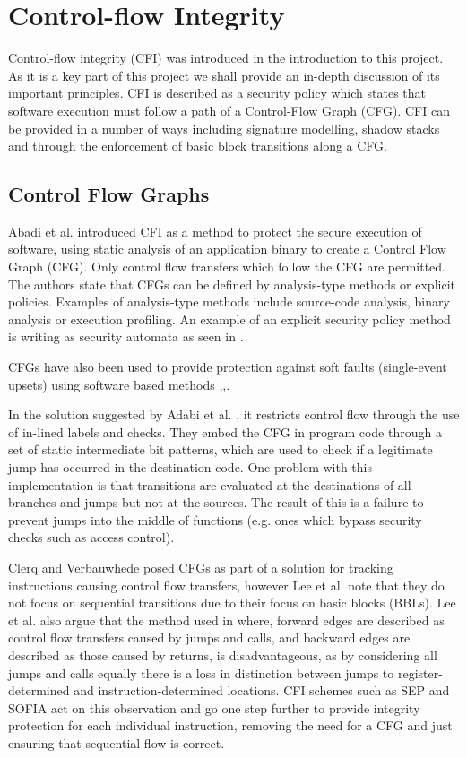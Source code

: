 \section{Control-flow Integrity}

Control-flow integrity (CFI) was introduced in the introduction to this project. As it is a key part of this project we shall provide an in-depth discussion of its important principles. CFI is described as a security policy which states that software execution must follow a path of a Control-Flow Graph (CFG). CFI can be provided in a number of ways including signature modelling, shadow stacks and through the enforcement of basic block transitions along a CFG.

\subsection{Control Flow Graphs}
Abadi et al. \cite{Abadi2005} introduced CFI as a method to protect the secure execution of software, using static analysis of an application binary to create a Control Flow Graph (CFG). Only control flow transfers which follow the CFG are permitted. The authors state that CFGs can be defined by analysis-type methods or explicit policies. Examples of analysis-type methods include source-code analysis, binary analysis or execution profiling. An example of an explicit security policy method is writing as security automata as seen in \cite{Erlingsson2004}. 

CFGs have also been used to provide protection against soft faults (single-event upsets) using software based methods \cite{Oh2002},\cite{Sharma2012},\cite{Venkatasubramanian2003}. 

In the solution suggested by Adabi et al. \cite{Abadi2005}, it restricts control flow through the use of in-lined labels and checks. They embed the CFG in program code through a set of static intermediate bit patterns, which are used to check if a legitimate jump has occurred in the destination code. One problem with this implementation is that transitions are evaluated at the destinations of all branches and jumps but not at the sources. The result of this is a failure to prevent jumps into the middle of functions (e.g. ones which bypass security checks such as access control).

Clerq and Verbauwhede \cite{DeClercq2017} posed CFGs as part of a solution for tracking instructions causing control flow transfers, however Lee et al. \cite{Lee2019} note that they do not focus on sequential transitions due to their focus on basic blocks (BBLs). Lee et al. also argue that the method used in \cite{DeClercq2017} where, forward edges are described as control flow transfers caused by jumps and calls, and backward edges are described as those caused by returns, is disadvantageous, as by considering all jumps and calls equally there is a loss in distinction between jumps to register-determined and instruction-determined locations. CFI schemes such as SEP \cite{Lee2019} and SOFIA \cite{DeClercq2017b} act on this observation and go one step further to provide integrity protection for each individual instruction, removing the need for a CFG and just ensuring that sequential flow is correct.


